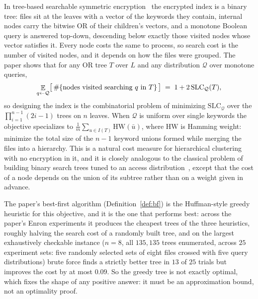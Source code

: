 \documentclass{aicr-conjecture}
\newcommand{\Qd}{\mathcal{Q}}
\newcommand{\SLC}{\mathrm{SLC}}
\newcommand{\HW}{\mathrm{HW}}
\newcommand{\Exp}{\mathop{\mathbb{E}}}
\begin{document}
In tree-based searchable symmetric encryption~\cite{Goh03,KP13,BlindSeer}
the encrypted index is a binary tree: files sit at the leaves with a
vector of the keywords they contain, internal nodes carry the bitwise OR
of their children's vectors, and a monotone Boolean query is answered
top-down, descending below exactly those visited nodes whose vector
satisfies it. Every node costs the same to process, so search cost is the
number of visited nodes, and it depends on how the files were grouped.
The paper shows that for any OR tree $T$ over $L$ and any distribution
$\Qd$ over monotone queries,
\[
  \Exp_{q \sample \Qd}\bigl[\,\#\{\text{nodes visited searching }
  q \text{ in } T\}\,\bigr] \;=\; 1 + 2\,\SLC_{\Qd}(T),
\]
so designing the index is the combinatorial problem of minimizing
$\SLC_{\Qd}$ over the $\prod_{i=1}^{n-1}(2i-1)$ trees on $n$ leaves. When
$\Qd$ is uniform over single keywords the objective specializes to
$\frac{1}{m}\sum_{u \in I(T)} \HW(\bar u)$, where $\HW$ is Hamming
weight: minimize the total size of the $n-1$ keyword unions formed while
merging the files into a hierarchy. This is a natural cost measure for
hierarchical clustering with no encryption in it, and it is closely
analogous to the classical problem of building binary search trees tuned
to an access distribution~\cite{Meh75,Nag97}, except that the cost of a
node depends on the union of its subtree rather than on a weight given in
advance.

The paper's best-first algorithm (Definition~\ref{def:bf}) is the
Huffman-style greedy heuristic for this objective, and it is the one that
performs best: across the paper's Enron experiments it produces the
cheapest trees of the three heuristics, roughly halving the search cost
of a randomly built tree, and on the largest exhaustively checkable
instance ($n=8$, all $135{,}135$ trees enumerated, across $25$ experiment
sets: five randomly selected sets of eight files crossed with five query
distributions) brute force finds a strictly better tree in $13$ of $25$
trials but improves the cost by at most $0.09$. So the greedy tree is not
exactly optimal, which fixes the shape of any positive answer: it must be
an approximation bound, not an optimality proof.
\end{document}

